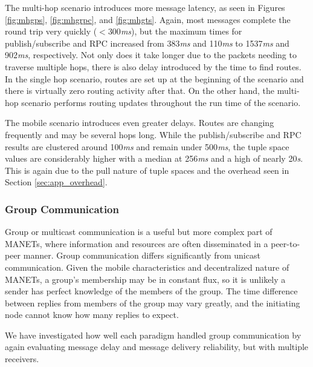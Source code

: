 The multi-hop scenario introduces more message latency, as seen in Figures \ref{fig:mhgps}, \ref{fig:mhgrpc}, and \ref{fig:mhgts}. Again, most messages complete the round trip very quickly ($<$300\textit{ms}), but the maximum times for publish/subscribe and RPC increased from 383\textit{ms} and 110\textit{ms} to 1537\textit{ms} and 902\textit{ms}, respectively. Not only does it take longer due to the packets needing to traverse multiple hops, there is also delay introduced by the time to find routes. In the single hop scenario, routes are set up at the beginning of the scenario and there is virtually zero routing activity after that. On the other hand, the multi-hop scenario performs routing updates throughout the run time of the scenario.

The mobile scenario introduces even greater delays. Routes are changing frequently and may be several hops long. While the publish/subscribe and RPC results are clustered around 100\textit{ms} and remain under 500\textit{ms}, the tuple space values are considerably higher with a median at 256\textit{ms} and a high of nearly 20\textit{s}. This is again due to the pull nature of tuple spaces and the overhead seen in Section \ref{sec:app_overhead}.

\subsubsection{Group Communication}

Group or multicast communication is a useful but more complex part of MANETs, where information and resources are often disseminated in a peer-to-peer manner. Group communication differs significantly from unicast communication. Given the mobile characteristics and decentralized nature of MANETs, a group's membership may be in constant flux, so it is unlikely a sender has perfect knowledge of the members of the group. The time difference between replies from members of the group may vary greatly, and the initiating node cannot know how many replies to expect.

We have investigated how well each paradigm handled group communication by again evaluating message delay and message delivery reliability, but with multiple receivers.

